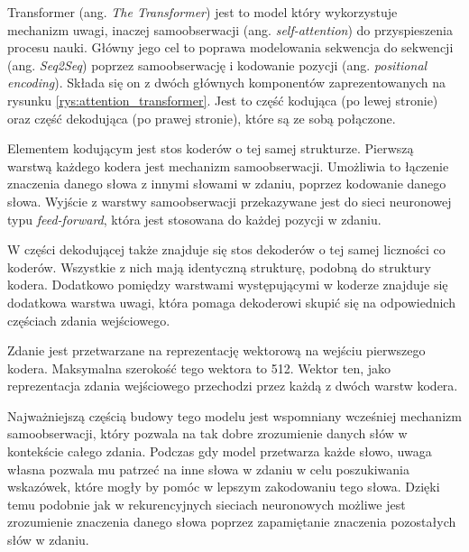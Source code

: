 Transformer (ang. \textit{The Transformer}) \cite{vaswani2017attention} jest to model który wykorzystuje mechanizm uwagi, inaczej samoobserwacji (ang. \textit{self-attention}) do przyspieszenia procesu nauki. Główny jego cel to poprawa modelowania sekwencja do sekwencji (ang. \textit{Seq2Seq}) poprzez samoobserwację  i kodowanie pozycji (ang. \textit{positional encoding}). Składa się on z dwóch głównych komponentów zaprezentowanych na rysunku \ref{rys:attention_transformer}. Jest to część kodująca (po lewej stronie) oraz część dekodująca (po prawej stronie), które są ze sobą połączone.

Elementem kodującym jest stos koderów o tej samej strukturze. Pierwszą warstwą każdego kodera jest mechanizm samoobserwacji. Umożliwia to łączenie znaczenia danego słowa z innymi słowami w zdaniu, poprzez kodowanie danego słowa. Wyjście z warstwy samoobserwacji przekazywane jest do sieci neuronowej typu \textit{feed-forward}, która jest stosowana do każdej pozycji w zdaniu.

W części dekodującej także znajduje się stos dekoderów o tej samej liczności co koderów. Wszystkie z nich mają identyczną strukturę, podobną do struktury kodera. Dodatkowo pomiędzy warstwami występującymi w koderze znajduje się dodatkowa warstwa uwagi, która pomaga dekoderowi skupić się na odpowiednich częściach zdania wejściowego. 

Zdanie jest przetwarzane na reprezentację wektorową na wejściu pierwszego kodera. Maksymalna szerokość tego wektora to 512. Wektor ten, jako reprezentacja zdania wejściowego przechodzi przez każdą z dwóch warstw kodera. 

Najważniejszą częścią budowy tego modelu jest wspomniany wcześniej mechanizm samoobserwacji, który pozwala na tak dobre zrozumienie danych słów w kontekście całego zdania. Podczas gdy model przetwarza każde słowo, uwaga własna pozwala mu patrzeć na inne słowa w zdaniu w celu poszukiwania wskazówek, które mogły by pomóc w lepszym zakodowaniu tego słowa. Dzięki temu podobnie jak w rekurencyjnych sieciach neuronowych możliwe jest zrozumienie znaczenia danego słowa poprzez zapamiętanie znaczenia pozostałych słów w zdaniu. 

